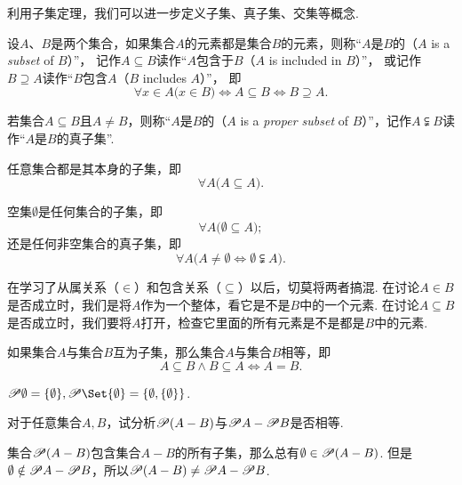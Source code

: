 利用子集定理，我们可以进一步定义子集、真子集、交集等概念.
\begin{definition}
设\(A\)、\(B\)是两个集合，如果集合\(A\)的元素都是集合\(B\)的元素，则称“\(A\)是\(B\)的（\(A\) is a \emph{subset} of \(B\)）”，%
记作\(A \subseteq B\)读作“\(A\)包含于\(B\)（\(A\) is included in \(B\)）”，%
或记作\(B \supseteq A\)读作“\(B\)包含\(A\)（\(B\) includes \(A\)）”，%
即\[
\forall x \in A \bigl( x \in B \bigr)
\iff A \subseteq B
\iff B \supseteq A.
\]

若集合\(A \subseteq B\)且\(A \neq B\)，则称“\(A\)是\(B\)的（\(A\) is a \emph{proper subset} of \(B\)）”，记作\(A \subsetneqq B\)读作“\(A\)是\(B\)的真子集”.
\end{definition}

\begin{theorem}
任意集合都是其本身的子集，即\[
\forall A \bigl( A \subseteq A \bigr).
\]
\end{theorem}

\begin{theorem}
空集\(\emptyset\)是任何集合的子集，即\[
\forall A \bigl( \emptyset \subseteq A \bigr);
\]还是任何非空集合的真子集，即\[
\forall A \bigl( A \neq \emptyset \iff \emptyset \subsetneqq A \bigr).
\]
\end{theorem}

在学习了从属关系（\(\in\)）和包含关系（\(\subseteq\)）以后，切莫将两者搞混.
在讨论\(A \in B\)是否成立时，我们是将\(A\)作为一个整体，看它是不是\(B\)中的一个元素.
在讨论\(A \subseteq B\)是否成立时，我们要将\(A\)打开，检查它里面的所有元素是不是都是\(B\)中的元素.

\begin{theorem}
如果集合\(A\)与集合\(B\)互为子集，那么集合\(A\)与集合\(B\)相等，即\[
A \subseteq B \land B \subseteq A
\iff
A = B.
\]
\end{theorem}

\begin{example}
\(\Powerset \emptyset = \{ \emptyset \},%
\Powerset \Set{ \emptyset } = \{ \emptyset, \{ \emptyset \} \}\).
\end{example}

\begin{example}
对于任意集合\(A,B\)，试分析\(\mathscr{P}(A-B)\)与\(\mathscr{P} A - \mathscr{P} B\)是否相等.
\begin{solution}
集合\(\mathscr{P}(A-B)\)包含集合\(A-B\)的所有子集，那么总有\(\emptyset\in\mathscr{P}(A-B)\).
但是\(\emptyset\notin\mathscr{P} A - \mathscr{P} B\)，所以\(\mathscr{P}(A-B) \neq \mathscr{P} A - \mathscr{P} B\).
\end{solution}
\end{example}

